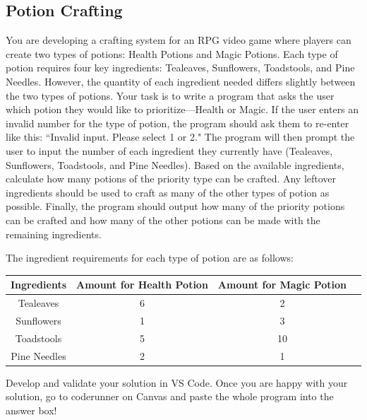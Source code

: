 \subsection{Potion Crafting}
You are developing a crafting system for an RPG video game where players can create two types of potions: Health Potions and Magic Potions. Each type of potion requires four key ingredients: Tealeaves, Sunflowers, Toadstools, and Pine Needles. However, the quantity of each ingredient needed differs slightly between the two types of potions.
\bigbreak
Your task is to write a program that asks the user which potion they would like to prioritize—Health or Magic. If the user enters an invalid number for the type of potion, the program should ask them to re-enter like this: ``Invalid input. Please select 1 or 2." The program will then prompt the user to input the number of each ingredient they currently have (Tealeaves, Sunflowers, Toadstools, and Pine Needles). Based on the available ingredients, calculate how many potions of the priority type can be crafted. Any leftover ingredients should be used to craft as many of the other types of potion as possible. Finally, the program should output how many of the priority potions can be crafted and how many of the other potions can be made with the remaining ingredients.

The ingredient requirements for each type of potion are as follows:

\begin{table}[H]
    \centering
       \begin{tabular}{|c|c|c|c|}
    \hline
    \textbf{Ingredients} & \textbf{Amount for Health Potion} &\textbf{Amount for Magic Potion} 
    \\
    \hline
    Tealeaves & 6 & 2
    \\
    \hline
    Sunflowers & 1 & 3
    \\
    \hline
    Toadstools & 5 & 10 \\
     \hline
    Pine Needles & 2 & 1 \\
    \hline
    \end{tabular}

\end{table}

Develop and validate your solution in VS Code. Once you are happy with your solution, go to coderunner on Canvas and paste the whole program into the answer box! 

